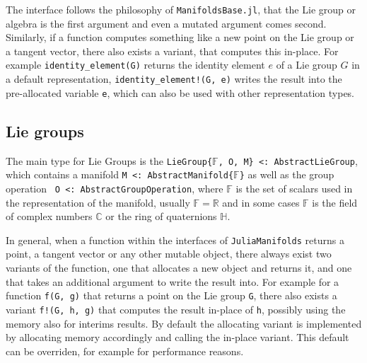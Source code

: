 \documentclass{juliacon}
\begin{document}
The interface follows the philosophy of \verb|ManifoldsBase.jl|, that the Lie group or algebra is the first argument and even a mutated argument comes second.
Similarly, if a function computes something like a new point on the Lie group or a tangent vector, there also exists a variant, that computes this in-place.
For example \verb|identity_element(G)| returns the identity element $e$ of a Lie group $G$ in a default representation, \verb|identity_element!(G, e)| writes the result into the pre-allocated variable \verb|e|, which can also be used with other representation types.

\subsection{Lie groups}

The main type for Lie Groups is the \verb|LieGroup{|$\mathbb {F}$\verb|, O, M} <: AbstractLieGroup|, which contains a manifold \verb|M <: AbstractManifold{|$\mathbb F$\verb|}| as well as the group operation \verb| O <: AbstractGroupOperation|, where $\mathbb {F}$ is the set of scalars used in the representation of the manifold, usually \(\mathbb {F} = \mathbb{R}\) and in some cases \(\mathbb {F}\) is the field of complex numbers \(\mathbb{C}\) or the ring of quaternions \(\mathbb H\).

In general, when a function within the interfaces of \verb|JuliaManifolds| returns a point, a tangent vector or any other mutable object, there always exist two variants of the function, one that allocates a new object and returns it, and one that takes an additional argument to write the result into. For example for a function \verb|f(G, g)| that returns a point on the Lie group \verb|G|, there also exists a variant \verb|f!(G, h, g)| that computes the result in-place of \verb|h|, possibly using the memory also for interims results. By default the allocating variant is implemented by allocating memory accordingly and calling the in-place variant. This default can be overriden, for example for performance reasons.
\end{document}
